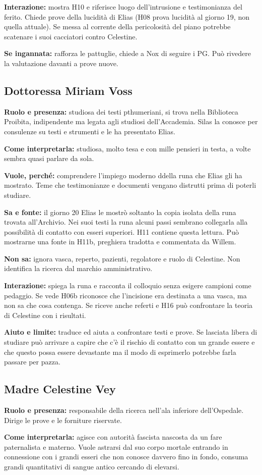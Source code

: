 \documentclass[11pt,a4paper]{article}
\begin{document}
\textbf{Interazione:} mostra H10 e riferisce luogo dell'intrusione e testimonianza del ferito. Chiede prove della lucidità di Elias (H08 prova lucidità al giorno 19, non quella attuale). Se messa al corrente della pericolosità del piano potrebbe scatenare i suoi cacciatori contro Celestine.

\textbf{Se ingannata:} rafforza le pattuglie, chiede a Nox di seguire i PG. Può rivedere la valutazione davanti a prove nuove. \par

\subsection{Dottoressa Miriam Voss}
\textbf{Ruolo e presenza:} studiosa dei testi pthumeriani, si trova nella Biblioteca Proibita, indipendente ma legata agli studiosi dell'Accademia. Silas la conosce per consulenze su testi e strumenti e le ha presentato Elias.\par
\textbf{Come interpretarla:} studiosa, molto tesa e con mille pensieri in testa, a volte sembra quasi parlare da sola. 

\textbf{Vuole, perché:} comprendere l'impiego moderno ddella runa che Elias gli ha mostrato. Teme che testimonianze e documenti vengano distrutti prima di poterli studiare.

\textbf{Sa e fonte:} il giorno 20 Elias le mostrò soltanto la copia isolata della runa trovata all'Archivio. Nei suoi testi la runa alcuni passi sembrano collegarla alla possibilità di contatto con esseri superiori. H11 contiene questa lettura. Può mostrarne una fonte in H11b, preghiera tradotta e commentata da Willem.

\textbf{Non sa:} ignora vasca, reperto, pazienti, regolatore e ruolo di Celestine. Non identifica la ricerca dal marchio amministrativo.

\textbf{Interazione:} spiega la runa e racconta il colloquio senza esigere campioni come pedaggio. Se vede H06b riconosce che l'incisione era destinata a una vasca, ma non sa che cosa contenga. Se riceve anche referti e H16 può confrontare la teoria di Celestine con i risultati.

\textbf{Aiuto e limite:} traduce ed aiuta a confrontare testi e prove. Se lasciata libera di studiare può arrivare a capire che c'è il rischio di contatto con un grande essere e che questo possa essere devastante ma il modo di esprimerlo potrebbe farla passare per pazza.

\subsection{Madre Celestine Vey}
\textbf{Ruolo e presenza:} responsabile della ricerca nell'ala inferiore dell'Ospedale. Dirige le prove e le forniture riservate.\par
\textbf{Come interpretarla:} agisce con autorità fascista nascosta da un fare paternalista e materno. Vuole astrarsi dal suo corpo mortale entrando in connessione con i grandi esseri che non conosce davvero fino in fondo, consuma grandi quantitativi di sangue antico cercando di elevarsi. 
\end{document}

